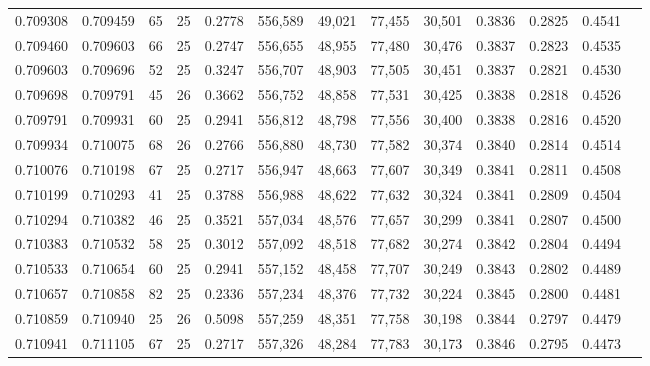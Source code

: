 \begin{tabular}{rrrrrrrrrrrrr}
0.709308 & 0.709459 &    65 &  25 &                                     0.2778 & 556,589 &  49,021 &  77,455 &  30,501 & 0.3836 & 0.2825 & 0.4541 \\
0.709460 & 0.709603 &    66 &  25 &                                     0.2747 & 556,655 &  48,955 &  77,480 &  30,476 & 0.3837 & 0.2823 & 0.4535 \\
0.709603 & 0.709696 &    52 &  25 &                                     0.3247 & 556,707 &  48,903 &  77,505 &  30,451 & 0.3837 & 0.2821 & 0.4530 \\
0.709698 & 0.709791 &    45 &  26 &                                     0.3662 & 556,752 &  48,858 &  77,531 &  30,425 & 0.3838 & 0.2818 & 0.4526 \\
0.709791 & 0.709931 &    60 &  25 &                                     0.2941 & 556,812 &  48,798 &  77,556 &  30,400 & 0.3838 & 0.2816 & 0.4520 \\
0.709934 & 0.710075 &    68 &  26 &                                     0.2766 & 556,880 &  48,730 &  77,582 &  30,374 & 0.3840 & 0.2814 & 0.4514 \\
0.710076 & 0.710198 &    67 &  25 &                                     0.2717 & 556,947 &  48,663 &  77,607 &  30,349 & 0.3841 & 0.2811 & 0.4508 \\
0.710199 & 0.710293 &    41 &  25 &                                     0.3788 & 556,988 &  48,622 &  77,632 &  30,324 & 0.3841 & 0.2809 & 0.4504 \\
0.710294 & 0.710382 &    46 &  25 &                                     0.3521 & 557,034 &  48,576 &  77,657 &  30,299 & 0.3841 & 0.2807 & 0.4500 \\
0.710383 & 0.710532 &    58 &  25 &                                     0.3012 & 557,092 &  48,518 &  77,682 &  30,274 & 0.3842 & 0.2804 & 0.4494 \\
0.710533 & 0.710654 &    60 &  25 &                                     0.2941 & 557,152 &  48,458 &  77,707 &  30,249 & 0.3843 & 0.2802 & 0.4489 \\
0.710657 & 0.710858 &    82 &  25 &                                     0.2336 & 557,234 &  48,376 &  77,732 &  30,224 & 0.3845 & 0.2800 & 0.4481 \\
0.710859 & 0.710940 &    25 &  26 &                                     0.5098 & 557,259 &  48,351 &  77,758 &  30,198 & 0.3844 & 0.2797 & 0.4479 \\
0.710941 & 0.711105 &    67 &  25 &                                     0.2717 & 557,326 &  48,284 &  77,783 &  30,173 & 0.3846 & 0.2795 & 0.4473 \\

\end{tabular}
